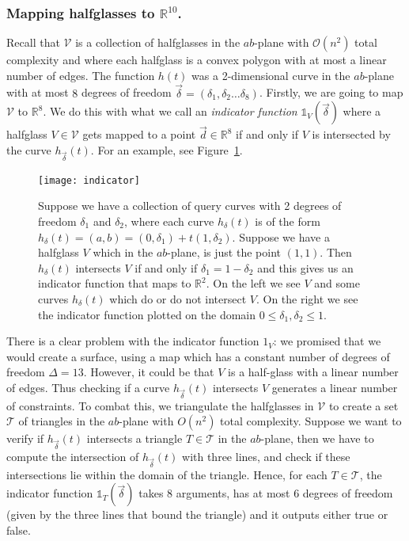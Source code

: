 \documentclass{article}
\begin{document}
\subsubsection{Mapping halfglasses to $\mathbb{R}^{10}$.}

Recall that $\mathcal{V}$ is a collection of halfglasses in the $ab$-plane with $\mathcal{O}(n^2)$ total complexity and where each halfglass is a convex polygon with at most a linear number of edges. The function $h(t)$ was a 2-dimensional curve in the $ab$-plane with at most $8$ degrees of freedom $\vec{\delta} = (\delta_1, \delta_2 \dots \delta_8)$. Firstly, we are going to map $\mathcal{V}$ to $\mathbb{R}^8$. We do this with what we call an \emph{indicator function} $\mathbb{1}_V(\vec{\delta})$ where a halfglass $V \in \mathcal{V}$ gets mapped to a point $\vec{d} \in \mathbb{R}^8$ if and only if $V$ is intersected by the curve $h_{\vec{\delta}}(t)$. For an example, see Figure~\ref{fig:indicator}.


\begin{figure}[H]
  \centering
  \texttt{[image: indicator]}
  \caption{Suppose we have a collection of query curves with 2 degrees of freedom $\delta_1$ and $\delta_2$, where each curve $h_\delta(t)$ is of the form $h_\delta(t) = (a,b) = (0, \delta_1) + t(1,\delta_2)$. Suppose we have a halfglass $V$ which in the $ab$-plane, is just the point $(1,1)$. Then $h_\delta(t)$ intersects $V$ if and only if $\delta_1 = 1 - \delta_2$ and this gives us an indicator function that maps to $\mathbb{R}^2$. On the left we see $V$ and some curves $h_\delta(t)$ which do or do not intersect $V$. On the right we see the indicator function plotted on the domain $0 \le \delta_1, \delta_2 \le 1$. }
    \label{fig:indicator}
\end{figure}

There is a clear problem with the indicator function $\mathcal{1}_V$: we promised that we would create a surface, using a map which has a constant number of degrees of freedom $\Delta = 13$. However, it could be that $V$ is a half-glass with a linear number of edges. Thus checking if a curve $h_{\vec{\delta}}(t)$ intersects $V$ generates a linear number of constraints. To combat this, we triangulate the halfglasses in $\mathcal{V}$ to create a set $\mathcal{T}$ of triangles in the $ab$-plane with $O(n^2)$ total complexity. Suppose we want to verify if $h_{\vec{\delta}}(t)$ intersects a triangle $T \in \mathcal{T}$ in the $ab$-plane, then we have to compute the intersection of $h_{\vec{\delta}}(t)$ with three lines, and check if these intersections lie within the domain of the triangle. Hence, for each $T \in \mathcal{T}$, the indicator function $\mathbb{1}_T(\vec{\delta})$ takes $8$ arguments, has at most $6$ degrees of freedom (given by the three lines that bound the triangle) and it outputs either true or false.
\end{document}
